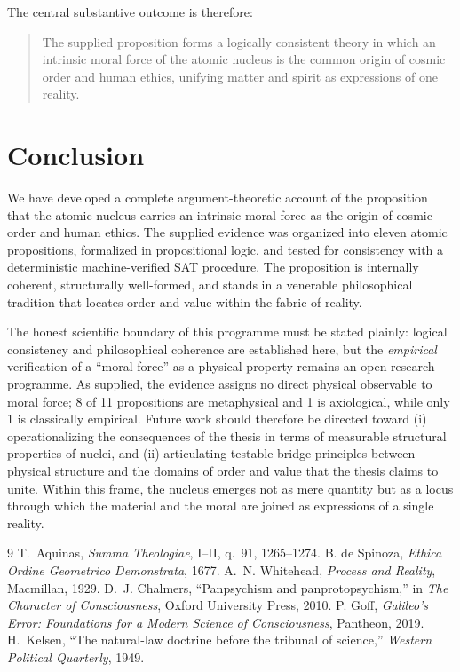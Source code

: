 \documentclass[11pt,a4paper]{article}
\begin{document}
\noindent
The central substantive outcome is therefore:
\begin{quote}
The supplied proposition forms a logically consistent theory in which an
intrinsic moral force of the atomic nucleus is the common origin of cosmic
order and human ethics, unifying matter and spirit as expressions of one
reality.
\end{quote}

\section{Conclusion}
\label{sec:conclusion}

We have developed a complete argument-theoretic account of the proposition
that the atomic nucleus carries an intrinsic moral force as the origin of
cosmic order and human ethics. The supplied evidence was organized into eleven
atomic propositions, formalized in propositional logic, and tested for
consistency with a deterministic machine-verified SAT procedure. The
proposition is internally coherent, structurally well-formed, and stands in a
venerable philosophical tradition that locates order and value within the
fabric of reality.

The honest scientific boundary of this programme must be stated plainly:
logical consistency and philosophical coherence are established here, but the
\emph{empirical} verification of a ``moral force'' as a physical property
remains an open research programme. As supplied, the evidence assigns no
direct physical observable to moral force; 8 of 11 propositions are
metaphysical and 1 is axiological, while only 1 is classically empirical.
Future work should therefore be directed toward (i) operationalizing the
consequences of the thesis in terms of measurable structural properties of
nuclei, and (ii) articulating testable bridge principles between physical
structure and the domains of order and value that the thesis claims to
unite. Within this frame, the nucleus emerges not as mere quantity but as a
locus through which the material and the moral are joined as expressions of a
single reality.

\begin{thebibliography}{9}
 T.~Aquinas, \emph{Summa Theologiae}, I--II, q.~91,
  1265--1274.
 B. de Spinoza, \emph{Ethica Ordine Geometrico Demonstrata},
  1677.
 A.~N. Whitehead, \emph{Process and Reality}, Macmillan,
  1929.
 D.~J. Chalmers, ``Panpsychism and panprotopsychism,'' in
  \emph{The Character of Consciousness}, Oxford University Press, 2010.
 P. Goff, \emph{Galileo's Error: Foundations for a Modern
  Science of Consciousness}, Pantheon, 2019.
 H.~Kelsen, ``The natural-law doctrine before the tribunal
  of science,'' \emph{Western Political Quarterly}, 1949.
\end{thebibliography}
\end{document}
